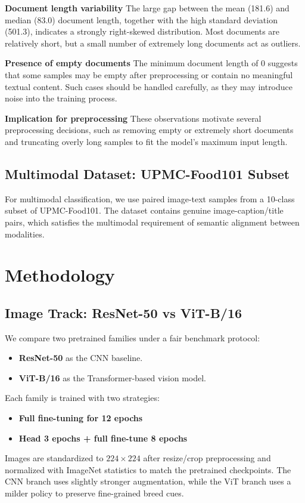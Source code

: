 \documentclass[twoside,final]{hcmut-report}
\begin{document}
\textbf{Document length variability} The large gap between the mean (181.6) and median (83.0) document length, together with the high standard deviation (501.3), indicates a strongly right-skewed distribution. Most documents are relatively short, but a small number of extremely long documents act as outliers.

\textbf{Presence of empty documents} The minimum document length of 0 suggests that some samples may be empty after preprocessing or contain no meaningful textual content. Such cases should be handled carefully, as they may introduce noise into the training process.

\textbf{Implication for preprocessing} These observations motivate several preprocessing decisions, such as removing empty or extremely short documents and truncating overly long samples to fit the model’s maximum input length.

\subsection{Multimodal Dataset: UPMC-Food101 Subset}
For multimodal classification, we use paired image-text samples from a 10-class subset of UPMC-Food101. The dataset contains genuine image-caption/title pairs, which satisfies the multimodal requirement of semantic alignment between modalities.




\section{Methodology}

\subsection{Image Track: ResNet-50 vs ViT-B/16}
We compare two pretrained families under a fair benchmark protocol:
\begin{itemize}[leftmargin=*, nosep]
    \item \textbf{ResNet-50} as the CNN baseline.
    \item \textbf{ViT-B/16} as the Transformer-based vision model.
\end{itemize}
Each family is trained with two strategies:
\begin{itemize}[leftmargin=*, nosep]
    \item \textbf{Full fine-tuning for 12 epochs}
    \item \textbf{Head 3 epochs + full fine-tune 8 epochs}
\end{itemize}
Images are standardized to $224 \times 224$ after resize/crop preprocessing and normalized with ImageNet statistics to match the pretrained checkpoints. The CNN branch uses slightly stronger augmentation, while the ViT branch uses a milder policy to preserve fine-grained breed cues.
\end{document}
